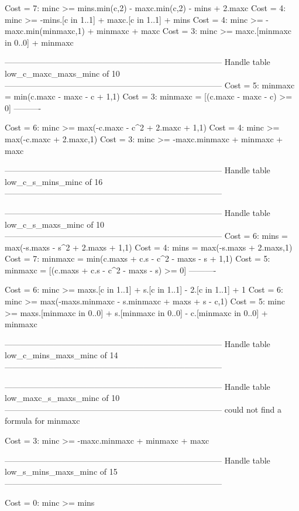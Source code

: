 Cost =  7:  minc >= mins.min(c,2) - maxc.min(c,2) - mins + 2.maxc
Cost =  4:  minc >= -mins.[c in 1..1] + maxc.[c in 1..1] + mins
Cost =  4:  minc >= -maxc.min(minmaxc,1) + minmaxc + maxc
Cost =  3:  minc >= maxc.[minmaxc in 0..0] + minmaxc

--------------------------------------------------------------------------------
Handle table low_c_maxc_maxs_minc of 10
--------------------------------------------------------------------------------
Cost =  5:  minmaxc = min(c.maxc - maxc - c + 1,1)
Cost =  3:  minmaxc = [(c.maxc - maxc - c) >= 0]
----------

Cost =  6:  minc >= max(-c.maxc - c^2 + 2.maxc + 1,1)
Cost =  4:  minc >= max(-c.maxc + 2.maxc,1)
Cost =  3:  minc >= -maxc.minmaxc + minmaxc + maxc

--------------------------------------------------------------------------------
Handle table low_c_s_mins_minc of 16
--------------------------------------------------------------------------------


--------------------------------------------------------------------------------
Handle table low_c_s_maxs_minc of 10
--------------------------------------------------------------------------------
Cost =  6:  mins    = max(-s.maxs - s^2 + 2.maxs + 1,1)
Cost =  4:  mins    = max(-s.maxs + 2.maxs,1)
Cost =  7:  minmaxc = min(c.maxs + c.s - c^2 - maxs - s + 1,1)
Cost =  5:  minmaxc = [(c.maxs + c.s - c^2 - maxs - s) >= 0]
----------

Cost =  6:  minc >= maxs.[c in 1..1] + s.[c in 1..1] - 2.[c in 1..1] + 1
Cost =  6:  minc >= max(-maxs.minmaxc - s.minmaxc + maxs + s - c,1)
Cost =  5:  minc >= maxs.[minmaxc in 0..0] + s.[minmaxc in 0..0] - c.[minmaxc in 0..0] + minmaxc

--------------------------------------------------------------------------------
Handle table low_c_mins_maxs_minc of 14
--------------------------------------------------------------------------------


--------------------------------------------------------------------------------
Handle table low_maxc_s_maxs_minc of 10
--------------------------------------------------------------------------------
could not find a formula for minmaxc

Cost =  3:  minc >= -maxc.minmaxc + minmaxc + maxc

--------------------------------------------------------------------------------
Handle table low_s_mins_maxs_minc of 15
--------------------------------------------------------------------------------

Cost =  0:  minc >= mins

